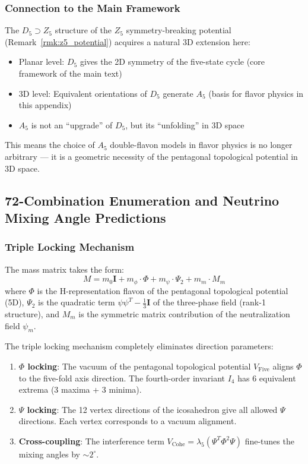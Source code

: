 \subsubsection{Connection to the Main Framework}

The $D_5 \supset Z_5$ structure of the $Z_5$ symmetry-breaking potential (Remark~\ref{rmk:z5_potential}) acquires a natural 3D extension here:

\begin{itemize}
\item Planar level: $D_5$ gives the 2D symmetry of the five-state cycle (core framework of the main text)
\item 3D level: Equivalent orientations of $D_5$ generate $A_5$ (basis for flavor physics in this appendix)
\item $A_5$ is not an ``upgrade'' of $D_5$, but its ``unfolding'' in 3D space
\end{itemize}

This means the choice of $A_5$ double-flavon models in flavor physics is no longer arbitrary --- it is a geometric necessity of the pentagonal topological potential in 3D space.

\subsection{72-Combination Enumeration and Neutrino Mixing Angle Predictions}
\label{subsec:72_combos}

\subsubsection{Triple Locking Mechanism}

The mass matrix takes the form:
\begin{equation}
M = m_0 \mathbf{I} + m_\phi \cdot \Phi + m_\psi \cdot \Psi_2 + m_m \cdot M_m
\label{eq:mass_matrix_flavor_en}
\end{equation}
where $\Phi$ is the H-representation flavon of the pentagonal topological potential (5D), $\Psi_2$ is the quadratic term $\psi\psi^T - \frac{1}{3}\mathbf{I}$ of the three-phase field (rank-1 structure), and $M_m$ is the symmetric matrix contribution of the neutralization field $\psi_m$.

The triple locking mechanism completely eliminates direction parameters:

\begin{enumerate}
\item \textbf{$\Phi$ locking}: The vacuum of the pentagonal topological potential $V_{\text{Five}}$ aligns $\Phi$ to the five-fold axis direction. The fourth-order invariant $I_4$ has 6 equivalent extrema (3 maxima + 3 minima).
\item \textbf{$\Psi$ locking}: The 12 vertex directions of the icosahedron give all allowed $\Psi$ directions. Each vertex corresponds to a vacuum alignment.
\item \textbf{Cross-coupling}: The interference term $V_{\text{Cohe}} = \lambda_5 (\Psi^T \Phi^2 \Psi)$ fine-tunes the mixing angles by $\sim 2^\circ$.
\end{enumerate}

